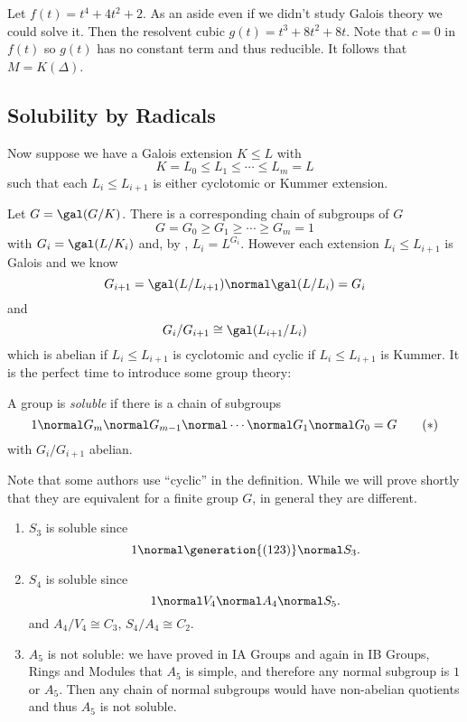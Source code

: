 \documentclass[a4paper]{article}
\begin{document}
\begin{eg}
  Let \(f(t) = t^4 + 4t^2 + 2\). As an aside even if we didn't study Galois theory we could solve it. Then the resolvent cubic \(g(t) = t^3 + 8t^2 + 8t\). Note that \(c = 0\) in \(f(t)\) so \(g(t)\) has no constant term and thus reducible. It follows that \(M = K(\Delta)\).
\end{eg}

\subsection{Solubility by Radicals}

Now suppose we have a Galois extension \(K \leq L\) with
\[
  K = L_0 \leq L_1 \leq \cdots \leq L_m = L
\]
such that each \(L_i \leq L_{i + 1}\) is either cyclotomic or Kummer extension.

Let \(G = \gal(G/K)\). There is a corresponding chain of subgroups of \(G\)
\[
  G = G_0 \geq G_1 \geq \cdots \geq G_m = 1
\]
with \(G_i = \gal(L/K_i)\) and, by , \(L_i = L^{G_i}\). However each extension \(L_i \leq L_{i + 1}\) is Galois and we know
\[
  G_{i + 1} = \gal(L/L_{i + 1}) \normal \gal(L/L_i) = G_i
\]
and
\[
  G_i/G_{i + 1} \cong \gal(L_{i + 1}/L_i)
\]
which is abelian if \(L_i \leq L_{i + 1}\) is cyclotomic and cyclic if \(L_i \leq L_{i + 1}\) is Kummer. It is the perfect time to introduce some group theory:

\begin{definition}
  A group is \emph{soluble} if there is a chain of subgroups
  \begin{equation}
    \label{eqn:abelian soluble}
    1 \normal G_m \normal G_{m - 1} \normal \cdots \normal G_1 \normal G_0 = G
    \tag{\(\ast\)}
  \end{equation}
  with \(G_i/G_{i + 1}\) abelian.
\end{definition}

\begin{remark}
  Note that some authors use ``cyclic'' in the definition. While we will prove shortly that they are equivalent for a finite group \(G\), in general they are different.
\end{remark}

\begin{eg}\leavevmode
  \begin{enumerate}
  \item \(S_3\) is soluble since
    \[
      1 \normal \generation{(123)} \normal S_3.
    \]
  \item \(S_4\) is soluble since
    \[
      1 \normal V_4 \normal A_4 \normal S_5.
    \]
    and \(A_4/V_4 \cong C_3\), \(S_4/A_4 \cong C_2\).
  \item \(A_5\) is not soluble: we have proved in IA Groups and again in IB Groups, Rings and Modules that \(A_5\) is simple, and therefore any normal subgroup is \(1\) or \(A_5\). Then any chain of normal subgroups would have non-abelian quotients and thus \(A_5\) is not soluble.
  \end{enumerate}
\end{eg}
\end{document}
